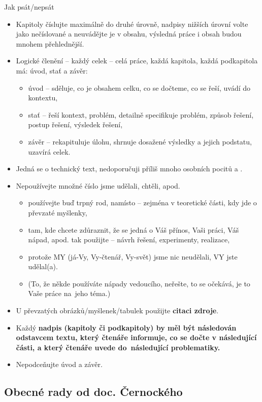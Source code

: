 Jak psát/nepsát
\begin{itemize}
  \item{Kapitoly číslujte maximálně do druhé úrovně, nadpisy nižších úrovní volte jako nečíslované a neuvádějte je v obsahu, výsledná práce i obsah budou mnohem přehlednější.}
  \item{Logické členění -- každý celek -- celá práce, každá kapitola, každá podkapitola má: úvod, stať a závěr:
    \begin{itemize}
      \item{úvod -- sděluje, co je obsahem celku, co se dočteme, co se řeší, uvádí do kontextu,}
      \item{stať -- řeší kontext, problém, detailně specifikuje problém, způsob řešení, postup řešení, výsledek řešení,}
      \item{závěr -- rekapituluje úlohu, shrnuje dosažené výsledky a jejich podstatu, uzavírá celek.}
    \end{itemize}}
  \item{Jedná se o technický text, nedoporučuji příliš mnoho osobních pocitů a .}
  \item{Nepoužívejte množné číslo  jsme udělali, chtěli, apod.
    \begin{itemize}
      \item{používejte buď trpný rod,  namísto  -- zejména v teoretické části, kdy jde o převzaté myšlenky,}
      \item{tam, kde chcete zdůraznit, že se jedná o Váš přínos, Vaši práci, Váš nápad, apod. tak použijte  -- návrh řešení, experimenty, realizace,}
      \item{protože MY (já-Vy, Vy-čtenář, Vy-svět) jsme nic neudělali, VY jste udělal(a).}
      \item{(To, že někde používáte nápady vedoucího, neřešte, to se očekává, je to Vaše práce na~jeho téma.)}
    \end{itemize}}
  \item{U převzatých obrázků/myšlenek/tabulek použijte \bf citaci zdroje\rm }.
  \item{Každý \bf nadpis \rm (kapitoly či podkapitoly) by měl být následován odstavcem textu, který čtenáře informuje, co se dočte v následující části, a který čtenáře uvede do~následující problematiky.}
  \item{Nepodceňujte úvod a závěr.}
\end{itemize}


\subsection*{Obecné rady od doc. Černockého}

